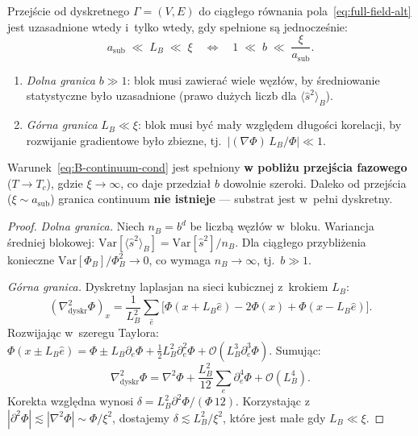 \begin{proposition}%
\label{prop:continuum-conditions}
Przej\'scie od dyskretnego $\Gamma = (V, E)$ do ci\k{a}g\l{}ego
r\'ownania pola~\eqref{eq:full-field-alt} jest uzasadnione
wtedy i~tylko wtedy, gdy spe\l{}nione s\k{a} jednocze\'snie:
\begin{equation}\label{eq:B-continuum-cond}
  \boxed{
    a_{\mathrm{sub}} \;\ll\; L_B \;\ll\; \xi
    \quad\Longleftrightarrow\quad
    1 \;\ll\; b \;\ll\; \frac{\xi}{a_{\mathrm{sub}}}.
  }
\end{equation}
\begin{enumerate}[nosep,label=(\roman*)]
  \item \emph{Dolna granica} $b \gg 1$: blok musi zawiera\'c
    wiele w\k{e}z\l{}\'ow, by \'sredniowanie statystyczne
    by\l{}o uzasadnione (prawo du\.zych liczb dla
    $\langle\hat{s}^2\rangle_B$).
  \item \emph{G\'orna granica} $L_B \ll \xi$: blok musi
    by\'c ma\l{}y wzgl\k{e}dem d\l{}ugo\'sci korelacji,
    by rozwijanie gradientowe by\l{}o zbiezne, tj.\
    $|(\nabla\Phi)\,L_B / \Phi| \ll 1$.
\end{enumerate}
Warunek~\eqref{eq:B-continuum-cond} jest spe\l{}niony
\textbf{w pobli\.zu przej\'scia fazowego} ($T \to T_c$),
gdzie $\xi \to \infty$, co daje przedzia\l{} $b$ dowolnie szeroki.
Daleko od przej\'scia ($\xi \sim a_{\mathrm{sub}}$) granica
continuum \textbf{nie istnieje} --- substrat jest w~pe\l{}ni
dyskretny.
\end{proposition}

\begin{proof}
\emph{Dolna granica.}
Niech $n_B = b^d$ be liczb\k{a} w\k{e}z\l{}\'ow w~bloku.
Wariancja \'sredniej blokowej:
$\mathrm{Var}[\langle\hat{s}^2\rangle_B]
= \mathrm{Var}[\hat{s}^2]/n_B$.
Dla ci\k{a}g\l{}ego przybli\.zenia konieczne
$\mathrm{Var}[\Phi_B]/\Phi_B^2 \to 0$, co wymaga $n_B \to \infty$,
tj.~$b \gg 1$.

\emph{G\'orna granica.}
Dyskretny laplasjan na sieci kubicznej z~krokiem $L_B$:
\begin{equation}
  (\nabla^2_{\mathrm{dyskr}}\Phi)_x
  = \frac{1}{L_B^2}\sum_{\hat{e}}\bigl[\Phi(x+L_B\hat{e})
    - 2\Phi(x) + \Phi(x-L_B\hat{e})\bigr].
\end{equation}
Rozwijaj\k{a}c w~szeregu Taylora:
$\Phi(x \pm L_B\hat{e}) = \Phi \pm L_B\partial_e\Phi
+ \tfrac{1}{2}L_B^2\partial_e^2\Phi
+ \mathcal{O}(L_B^3\partial_e^3\Phi)$.
Sumuj\k{a}c:
\begin{equation}
  \nabla^2_{\mathrm{dyskr}}\Phi
  = \nabla^2\Phi + \frac{L_B^2}{12}\sum_e\partial_e^4\Phi
    + \mathcal{O}(L_B^4).
\end{equation}
Korekta wzgl\k{e}dna wynosi
$\delta = L_B^2 \partial^2\Phi /(\Phi\,12)$.
Korzystaj\k{a}c z~$|\partial^2\Phi| \lesssim |\nabla^2\Phi|
\sim \Phi/\xi^2$, dostajemy $\delta \lesssim L_B^2/\xi^2$,
kt\'ore jest ma\l{}e gdy $L_B \ll \xi$.
\end{proof}

